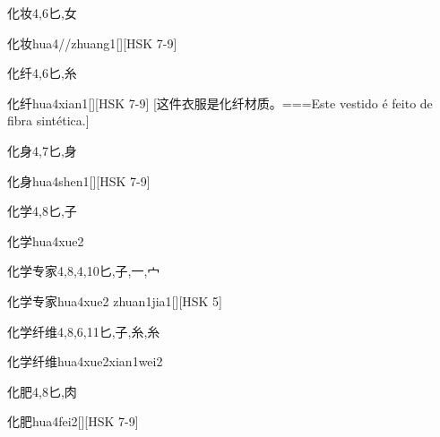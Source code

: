 \begin{Entry}{化妆}{4,6}{⼔,⼥}
  \begin{Phonetics}{化妆}{hua4//zhuang1}[][HSK 7-9]
  \end{Phonetics}
\end{Entry}

\begin{Entry}{化纤}{4,6}{⼔,⽷}
  \begin{Phonetics}{化纤}{hua4xian1}[][HSK 7-9]
    [这件衣服是化纤材质。===Este vestido é feito de fibra sintética.]
  \end{Phonetics}
\end{Entry}

\begin{Entry}{化身}{4,7}{⼔,⾝}
  \begin{Phonetics}{化身}{hua4shen1}[][HSK 7-9]
  \end{Phonetics}
\end{Entry}

\begin{Entry}{化学}{4,8}{⼔,⼦}
  \begin{Phonetics}{化学}{hua4xue2}
  \end{Phonetics}
\end{Entry}

\begin{Entry}{化学专家}{4,8,4,10}{⼔,⼦,⼀,⼧}
  \begin{Phonetics}{化学专家}{hua4xue2 zhuan1jia1}[][HSK 5]
  \end{Phonetics}
\end{Entry}

\begin{Entry}{化学纤维}{4,8,6,11}{⼔,⼦,⽷,⽷}
  \begin{Phonetics}{化学纤维}{hua4xue2xian1wei2}
  \end{Phonetics}
\end{Entry}

\begin{Entry}{化肥}{4,8}{⼔,⾁}
  \begin{Phonetics}{化肥}{hua4fei2}[][HSK 7-9]
  \end{Phonetics}
\end{Entry}

